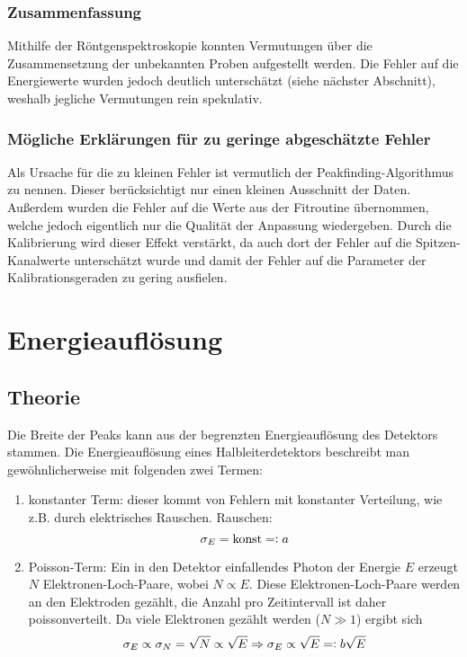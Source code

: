 \documentclass{../Misc/MontavonLaTeX/Montavon}
\newcommand{\eqdef}{=\vcentcolon}
\begin{document}
\subsubsection{Zusammenfassung}
Mithilfe der Röntgenspektroskopie konnten Vermutungen über die Zusammensetzung der unbekannten Proben aufgestellt werden. 
Die Fehler auf die Energiewerte wurden jedoch deutlich unterschätzt (siehe nächster Abschnitt), weshalb jegliche Vermutungen rein spekulativ.

\subsubsection{Mögliche Erklärungen für zu geringe abgeschätzte Fehler}
Als Ursache für die zu kleinen Fehler ist vermutlich der Peakfinding-Algorithmus zu nennen. Dieser berücksichtigt nur einen kleinen Ausschnitt der Daten. Außerdem wurden die Fehler auf die Werte aus der Fitroutine übernommen, welche jedoch eigentlich nur die Qualität der Anpassung wiedergeben.
Durch die Kalibrierung wird dieser Effekt verstärkt, da auch dort der Fehler auf die Spitzen-Kanalwerte unterschätzt wurde und damit der Fehler auf die Parameter der Kalibrationsgeraden zu gering ausfielen.

\section{Energieauflösung}
\subsection{Theorie}
Die Breite der Peaks kann aus der begrenzten Energieauflösung des Detektors stammen. 
Die Energieauflösung eines Halbleiterdetektors beschreibt man gewöhnlicherweise mit folgenden zwei Termen:
\begin{enumerate}

\item konstanter Term: dieser kommt von Fehlern mit konstanter Verteilung, wie z.B. durch elektrisches Rauschen. 
Rauschen:
\[
\sigma_E = \textrm{konst} \eqdef a
\]

\item Poisson-Term: Ein in den Detektor einfallendes Photon der Energie $E$ erzeugt $N$ Elektronen-Loch-Paare, wobei $N \propto E$. Diese Elektronen-Loch-Paare werden an den Elektroden gezählt, die Anzahl pro Zeitintervall ist daher poissonverteilt. Da viele Elektronen gezählt werden ($N \gg 1$) ergibt sich 
\[ \sigma_E \propto \sigma_N = \sqrt{N} \propto \sqrt{E} \Rightarrow \sigma_E \propto \sqrt{E} \eqdef b \sqrt{E} \]

\end{enumerate}
\end{document}
